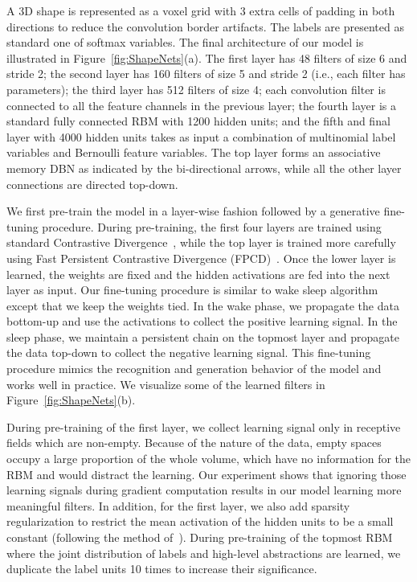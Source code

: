 \documentclass[10pt,twocolumn,letterpaper]{article}
\begin{document}
A 3D shape is represented as a  voxel grid with 3 extra cells of padding in both directions to reduce the convolution border artifacts. The labels are presented as standard one of  softmax variables.
The final architecture of our model is illustrated in Figure~\ref{fig:ShapeNets}(a). The first layer has 48 filters of size 6 and stride 2; the second layer has 160 filters of size 5 and stride 2 
(i.e., each filter has  parameters); the third layer has 512 filters of size 4; each convolution filter is connected to all the feature channels in the previous layer; the fourth layer is a standard fully connected RBM with 1200 hidden units; and the fifth and final layer with 4000 hidden units takes as input a combination of multinomial label variables and Bernoulli feature variables. The top layer forms an associative memory DBN as indicated by the bi-directional arrows, while all the other layer connections are directed top-down. 

We first pre-train the model in a layer-wise fashion followed by a generative fine-tuning procedure. During pre-training, the first four layers are trained using standard Contrastive Divergence~\cite{CD}, while the top layer is trained more carefully using Fast Persistent Contrastive Divergence (FPCD)~\cite{FPCD}. Once the lower layer is learned, the weights are fixed and the hidden activations are fed into the next layer as input. Our fine-tuning procedure is similar to wake sleep algorithm~\cite{DBN} except that we keep the weights tied. In the wake phase, we propagate the data bottom-up and use the activations to collect the positive learning signal. In the sleep phase, we maintain a persistent chain on the topmost layer and propagate the data top-down to collect the negative learning signal. This fine-tuning procedure mimics the recognition and generation behavior of the model and works well in practice. 
We visualize some of the learned filters in Figure~\ref{fig:ShapeNets}(b).

During pre-training of the first layer, we collect learning signal only in receptive fields which are non-empty. Because of the nature of the data, empty spaces occupy a large proportion of the whole volume, which have no information for the RBM and would distract the learning. Our experiment shows that ignoring those learning signals during gradient computation results in our model learning more meaningful filters. In addition, for the first layer, we also add sparsity regularization to restrict the mean activation of the hidden units to be a small constant (following the method of~\cite{Sparsity}).
During pre-training of the topmost RBM where the joint distribution of labels and high-level abstractions are learned, we duplicate the label units 10 times to increase their significance.
\end{document}
